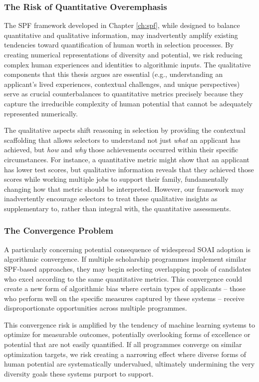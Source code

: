 \subsubsection{The Risk of Quantitative Overemphasis}
The SPF framework developed in Chapter \ref{ch:spf}, while designed to balance quantitative and qualitative information, may inadvertently amplify existing tendencies toward quantification of human worth in selection processes. By creating numerical representations of diversity and potential, we risk reducing complex human experiences and identities to algorithmic inputs. The qualitative components that this thesis argues are essential (e.g., understanding an applicant's lived experiences, contextual challenges, and unique perspectives) serve as crucial counterbalances to quantitative metrics precisely because they capture the irreducible complexity of human potential that cannot be adequately represented numerically.

The qualitative aspects shift reasoning in selection by providing the contextual scaffolding that allows selectors to understand not just \emph{what} an applicant has achieved, but \emph{how} and \emph{why} those achievements occurred within their specific circumstances. For instance, a quantitative metric might show that an applicant has lower test scores, but qualitative information reveals that they achieved those scores while working multiple jobs to support their family, fundamentally changing how that metric should be interpreted. However, our framework may inadvertently encourage selectors to treat these qualitative insights as supplementary to, rather than integral with, the quantitative assessments.

\subsubsection{The Convergence Problem}
A particularly concerning potential consequence of widespread SOAI adoption is algorithmic convergence. If multiple scholarship programmes implement similar SPF-based approaches, they may begin selecting overlapping pools of candidates who excel according to the same quantitative metrics. This convergence could create a new form of algorithmic bias where certain types of applicants – those who perform well on the specific measures captured by these systems – receive disproportionate opportunities across multiple programmes.

This convergence risk is amplified by the tendency of machine learning systems to optimize for measurable outcomes, potentially overlooking forms of excellence or potential that are not easily quantified. If all programmes converge on similar optimization targets, we risk creating a narrowing effect where diverse forms of human potential are systematically undervalued, ultimately undermining the very diversity goals these systems purport to support.

